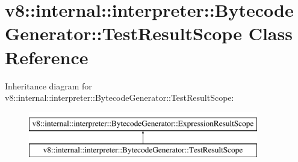 \hypertarget{classv8_1_1internal_1_1interpreter_1_1BytecodeGenerator_1_1TestResultScope}{}\section{v8\+:\+:internal\+:\+:interpreter\+:\+:Bytecode\+Generator\+:\+:Test\+Result\+Scope Class Reference}
\label{classv8_1_1internal_1_1interpreter_1_1BytecodeGenerator_1_1TestResultScope}
Inheritance diagram for v8\+:\+:internal\+:\+:interpreter\+:\+:Bytecode\+Generator\+:\+:Test\+Result\+Scope\+:\begin{figure}[H]
\begin{center}
\leavevmode
\includegraphics[height=2.000000cm]{classv8_1_1internal_1_1interpreter_1_1BytecodeGenerator_1_1TestResultScope}
\end{center}
\end{figure}

